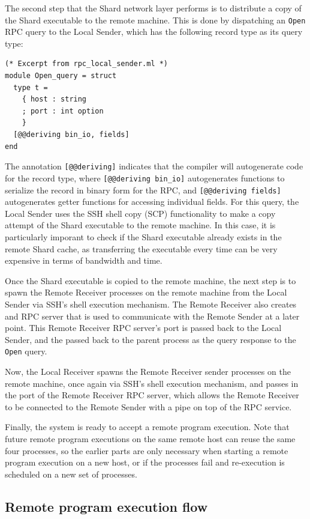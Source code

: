 \documentclass[twoside]{report}
\begin{document}
The second step that the Shard network layer performs is to distribute a copy of the Shard executable to the remote machine.
This is done by dispatching an \texttt{Open} RPC query to the Local Sender, which has the following record type as its query type:
\begin{lstlisting}
(* Excerpt from rpc_local_sender.ml *)
module Open_query = struct
  type t =
    { host : string
    ; port : int option
    }
  [@@deriving bin_io, fields]
end
\end{lstlisting}
The annotation \texttt{[@@deriving]} indicates that the compiler will autogenerate code for the record type, where \texttt{[@@deriving bin\_io]} autogenerates functions to serialize the record in binary form for the RPC, and \texttt{[@@deriving fields]} autogenerates getter functions for accessing individual fields.
For this query, the Local Sender uses the SSH shell copy (SCP) functionality to make a copy attempt of the Shard executable to the remote machine.
In this case, it is particularly imporant to check if the Shard executable already exists in the remote Shard cache, as transferring the executable every time can be very expensive in terms of bandwidth and time.

Once the Shard executable is copied to the remote machine, the next step is to spawn the Remote Receiver processes on the remote machine from the Local Sender via SSH's shell execution mechanism.
The Remote Receiver also creates and RPC server that is used to communicate with the Remote Sender at a later point.
This Remote Receiver RPC server's port is passed back to the Local Sender, and the passed back to the parent process as the query response to the \texttt{Open} query.

Now, the Local Receiver spawns the Remote Receiver sender processes on the remote machine, once again via SSH's shell execution mechanism, and passes in the port of the Remote Receiver RPC server, which allows the Remote Receiver to be connected to the Remote Sender with a pipe on top of the RPC service.

Finally, the system is ready to accept a remote program execution.
Note that future remote program executions on the same remote host can reuse the same four processes, so the earlier parts are only necessary when starting a remote program execution on a new host, or if the processes fail and re-execution is scheduled on a new set of processes.

\subsection{Remote program execution flow}
\end{document}
